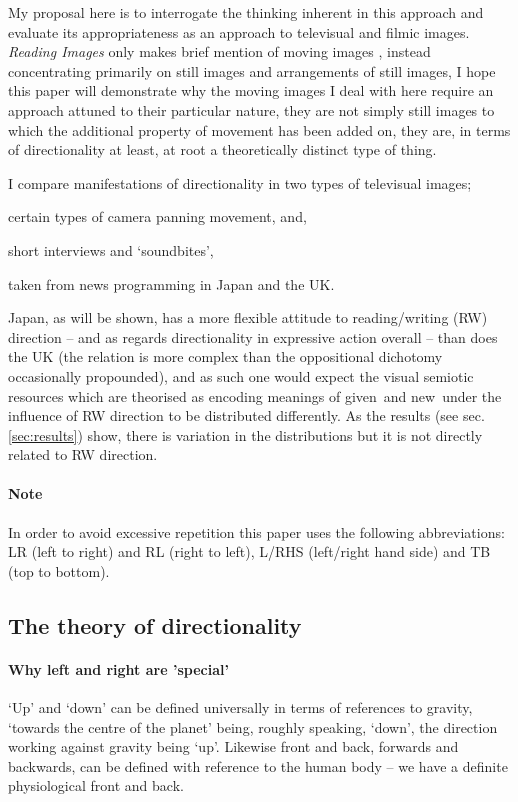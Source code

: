 \documentclass[11pt, oneside, a4paper]{scrartcl}
\newcommand{\nw} {{\sc new}}
\newcommand{\gv} {{\sc given}}
\newenvironment{close_enum}{
\begin{enumerate}
 \setlength{\itemsep}{1pt}
 \setlength{\parskip}{1pt}
 \setlength{\parsep}{0pt}}{\end{enumerate}
}
\begin{document}
My proposal here is to interrogate the thinking inherent in this approach and evaluate its appropriateness as an approach to televisual and filmic images. \emph{Reading Images} only makes brief mention of moving images \citep[258--265]{Kress:2006}, instead concentrating primarily on still images and arrangements of still images, I hope this paper will demonstrate why the moving images I deal with here require an approach attuned to their particular nature, they are not simply still images to which the additional property of movement has been added on, they are, in terms of directionality at least, at root a theoretically distinct type of thing.

\bigskip

I compare manifestations of directionality in two types of televisual images;
\begin{close_enum}
\item certain types of camera panning movement, and, 
\item short interviews and `soundbites', 
\end{close_enum}
taken from news programming in Japan and the UK. 
 
Japan, as will be shown, has a more flexible attitude to reading/writing (RW) direction -- and as regards directionality in expressive action overall -- than does the UK (the relation is more complex than the oppositional dichotomy occasionally propounded), and as such one would expect the visual semiotic resources which are theorised as encoding meanings of \gv\ and \nw\ under the influence of RW direction to be distributed differently. As the results (see sec.\ref{sec:results}) show, there is variation in the distributions but it is not directly related to RW direction. 

\paragraph{Note} In order to avoid excessive repetition this paper uses the following abbreviations: LR (left to right) and RL (right to left), L/RHS (left/right hand side) and TB (top to bottom). 

\subsection{The theory of directionality}

\paragraph{Why left and right are 'special'}
`Up' and `down' can be defined universally in terms of references to gravity, `towards the centre of the planet' being, roughly speaking, `down', the direction working against gravity being `up'. Likewise front and back, forwards and backwards, can be defined with reference to the human body -- we have a definite physiological front and back.
\end{document}
